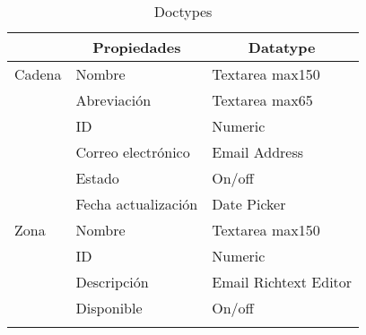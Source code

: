 \begin{longtable}{ | p{5em} | l | l | }
   \hline
   \rowcolor{blue!25}
   \multicolumn{1}{|c|}{Doctype} &
   \multicolumn{1}{|c|}{Propiedades} &
   \multicolumn{1}{|c|}{Datatype} \\
   \hline
   \endhead

   \hline
   \endfoot

   \endlastfoot

   Cadena
       & Nombre & Textarea max150 \\
       \cline{2-3}
       & Abreviación & Textarea max65 \\
       \cline{2-3}
       & ID & Numeric \\
       \cline{2-3}
       & Correo electrónico & Email Address \\
       \cline{2-3}
       & Estado & On/off \\
       \cline{2-3}
       & Fecha actualización & Date Picker \\
   \hline
   Zona 
        & Nombre & Textarea max150 \\
        \cline{2-3}
        & ID & Numeric \\
        \cline{2-3}
        & Descripción & Email Richtext Editor \\
        \cline{2-3}
        & Disponible & On/off \\
    \hline

   \caption{Doctypes}
   \label{table:doctypes}
\end{longtable}
